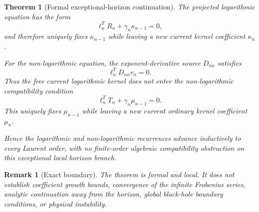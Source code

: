 \documentclass[11pt]{article}
\newtheorem{theorem}{Theorem}
\newtheorem{remark}{Remark}
\begin{document}
\begin{theorem}[Formal exceptional-horizon continuation]
The projected logarithmic equation has the form
\[
  \ell_n^T R_n+\gamma_n\kappa_{n-1}=0,
\]
and therefore uniquely fixes $\kappa_{n-1}$ while leaving a new
current kernel coefficient $\kappa_n$.

For the non-logarithmic equation, the exponent-derivative source
$D_{nn}$ satisfies
\[
  \ell_n^T D_{nn}r_n=0.
\]
Thus the free current logarithmic kernel does not enter the
non-logarithmic compatibility condition
\[
  \ell_n^T T_n+\gamma_n\mu_{n-1}=0.
\]
This uniquely fixes $\mu_{n-1}$ while leaving a new current ordinary
kernel coefficient $\mu_n$.

Hence the logarithmic and non-logarithmic recurrences advance
inductively to every Laurent order, with no finite-order algebraic
compatibility obstruction on this exceptional local horizon branch.
\end{theorem}

\begin{remark}[Exact boundary]
The theorem is formal and local. It does not establish coefficient
growth bounds, convergence of the infinite Frobenius series, analytic
continuation away from the horizon, global black-hole boundary
conditions, or physical instability.
\end{remark}
\end{document}

